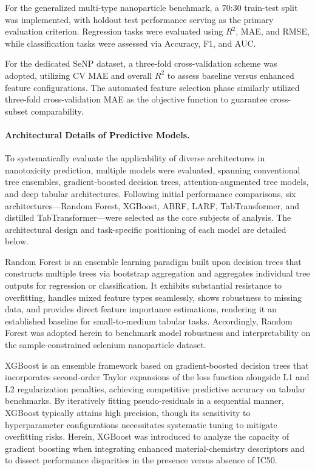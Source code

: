 For the generalized multi-type nanoparticle benchmark, a 70:30 train-test split was implemented, with holdout test performance serving as the primary evaluation criterion. Regression tasks were evaluated using $R^2$, MAE, and RMSE, while classification tasks were assessed via Accuracy, F1, and AUC.

For the dedicated SeNP dataset, a three-fold cross-validation scheme was adopted, utilizing CV MAE and overall $R^2$ to assess baseline versus enhanced feature configurations. The automated feature selection phase similarly utilized three-fold cross-validation MAE as the objective function to guarantee cross-subset comparability.

\paragraph{Architectural Details of Predictive Models.}
To systematically evaluate the applicability of diverse architectures in nanotoxicity prediction, multiple models were evaluated, spanning conventional tree ensembles, gradient-boosted decision trees, attention-augmented tree models, and deep tabular architectures. Following initial performance comparisons, six architectures—Random Forest, XGBoost, ABRF, LARF, TabTransformer, and distilled TabTransformer—were selected as the core subjects of analysis. The architectural design and task-specific positioning of each model are detailed below.

Random Forest is an ensemble learning paradigm built upon decision trees that constructs multiple trees via bootstrap aggregation and aggregates individual tree outputs for regression or classification. It exhibits substantial resistance to overfitting, handles mixed feature types seamlessly, shows robustness to missing data, and provides direct feature importance estimations, rendering it an established baseline for small-to-medium tabular tasks. Accordingly, Random Forest was adopted herein to benchmark model robustness and interpretability on the sample-constrained selenium nanoparticle dataset.

XGBoost is an ensemble framework based on gradient-boosted decision trees that incorporates second-order Taylor expansions of the loss function alongside L1 and L2 regularization penalties, achieving competitive predictive accuracy on tabular benchmarks. By iteratively fitting pseudo-residuals in a sequential manner, XGBoost typically attains high precision, though its sensitivity to hyperparameter configurations necessitates systematic tuning to mitigate overfitting risks. Herein, XGBoost was introduced to analyze the capacity of gradient boosting when integrating enhanced material-chemistry descriptors and to dissect performance disparities in the presence versus absence of IC50.

